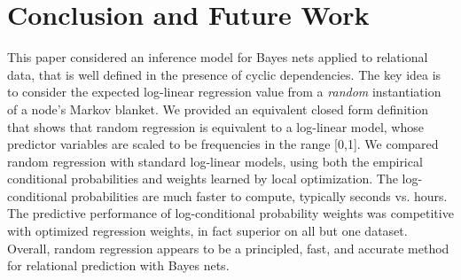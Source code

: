 \documentclass[twoside,leqno,twocolumn]{article}
\begin{document}



\section{Conclusion and Future Work} This paper considered an inference model for Bayes nets applied to relational data, that is well defined in the presence of cyclic dependencies. The key idea is to consider the expected log-linear regression value from a {\em random} instantiation of a node's Markov blanket. We provided an equivalent closed form definition that shows that random regression is equivalent to a log-linear model, whose predictor variables are scaled to be frequencies in the range [0,1]. We compared random regression with standard log-linear models, using both the empirical conditional probabilities and weights learned by local optimization. 
The log-conditional probabilities are much faster to compute, typically seconds vs. hours. The predictive performance of log-conditional probability weights was competitive with optimized regression weights, in fact superior on all but one dataset. Overall, random regression appears to be a principled, fast, and accurate method for relational prediction with Bayes nets.
%



\end{document}
